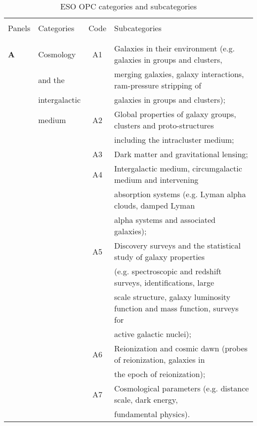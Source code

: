 \documentclass{article}
\begin{document}
\begin{table}[p]
\caption{ESO OPC categories and subcategories}
\label{tab:categories}
\medskip
{\small\sf
\begin{center}
\begin{tabular}{llcl} 
\hline\hline
& & & \\
Panels & Categories & Code & Subcategories \\
& & & \\
\hline 
& & & \\[-6pt]
{\bf A}& Cosmology & A1 & Galaxies in their environment (e.g. galaxies in groups and clusters, \\
       & and the   &    & merging galaxies, galaxy interactions, ram-pressure stripping of \\
       & intergalactic & & galaxies in groups and clusters); \\
       & medium    & A2 & Global properties of galaxy groups, clusters and proto-structures \\
       &           &    & including the intracluster medium; \\
       &           & A3 & Dark matter and gravitational lensing; \\
       &           & A4 & Intergalactic medium, circumgalactic medium and intervening \\
       &           &    & absorption systems (e.g. Lyman alpha clouds, damped Lyman \\
       &           &    & alpha systems and associated galaxies); \\  
       &           & A5 & Discovery surveys and the statistical study of galaxy properties \\
       &           &    & (e.g. spectroscopic and redshift surveys, identifications, large \\
       &           &    & scale structure, galaxy luminosity function and mass function, surveys for \\
       &           &    & active galactic nuclei); \\
       &           & A6 & Reionization and cosmic dawn (probes of reionization, galaxies in \\
       &           &    & the epoch of reionization); \\  
       &           & A7 & Cosmological parameters (e.g. distance scale, dark energy, \\
       &           &    & fundamental physics). \\[4pt]  

\end{tabular}
\end{center}}
\end{table}
\end{document}
